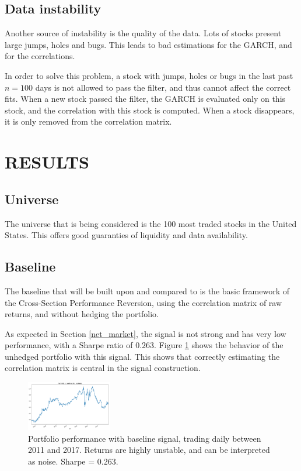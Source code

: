 \documentclass[letterpaper, 10 pt, conference]{ieeeconf}  %
\begin{document}
\subsection{Data instability}

Another source of instability is the quality of the data. Lots of stocks present large jumps, holes and bugs. This leads to bad estimations for the GARCH, and for the correlations.

In order to solve this problem, a stock with jumps, holes or bugs in the last past $n = 100$ days is not allowed to pass the filter, and thus cannot affect the correct fits. When a new stock passed the filter, the GARCH is evaluated only on this stock, and the correlation with this stock is computed. When a stock disappears, it is only removed from the correlation matrix.

\section{RESULTS}
\label{sectionresults}
\subsection{Universe}

The universe that is being considered is the 100 most traded stocks in the United States. This offers good guaranties of liquidity and data availability.

\subsection{Baseline}

The baseline that will be built upon and compared to is the basic framework of the Cross-Section Performance Reversion, using the correlation matrix of raw returns, and without hedging the portfolio.

As expected in Section \ref{net_market}, the signal is not strong and has very low performance, with a Sharpe ratio of $0.263$. Figure \ref{bad_result} shows the behavior of the unhedged portfolio with this signal. This shows that correctly estimating the correlation matrix is central in the signal construction.



\begin{figure}[thpb]
\centering
\includegraphics[width=140px]{img/Fit_vanilla_execute_vanilla.png}
\caption{Portfolio performance with baseline signal, trading daily between 2011 and 2017. Returns are highly unstable, and can be interpreted as noise. Sharpe = $0.263$.}
\label{bad_result}
\end{figure}
\end{document}
